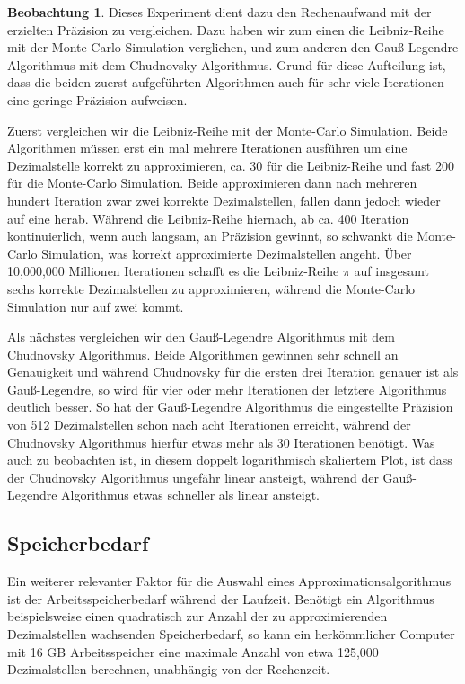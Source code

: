 \documentclass{scrartcl}
\theoremstyle{definition}
\newtheorem{approximation sequence}{Annäherungsfolge}
\newtheorem{observation}{Beobachtung}
\begin{document}
\begin{observation}
    Dieses Experiment dient dazu den Rechenaufwand mit der erzielten Präzision
    zu vergleichen. Dazu haben wir zum einen die Leibniz-Reihe mit der
    Monte-Carlo Simulation verglichen, und zum anderen den Gauß-Legendre
    Algorithmus mit dem Chudnovsky Algorithmus. Grund für diese Aufteilung ist,
    dass die beiden zuerst aufgeführten Algorithmen auch für sehr viele
    Iterationen eine geringe Präzision aufweisen.

    Zuerst vergleichen wir die Leibniz-Reihe mit der Monte-Carlo Simulation.
    Beide Algorithmen müssen erst ein mal mehrere Iterationen ausführen um eine
    Dezimalstelle korrekt zu approximieren, ca. 30 für die Leibniz-Reihe und
    fast 200 für die Monte-Carlo Simulation. Beide approximieren dann nach
    mehreren hundert Iteration zwar zwei korrekte Dezimalstellen, fallen dann
    jedoch wieder auf eine herab. Während die Leibniz-Reihe hiernach, ab ca.
    400 Iteration kontinuierlich, wenn auch langsam, an Präzision gewinnt, so
    schwankt die Monte-Carlo Simulation, was korrekt approximierte
    Dezimalstellen angeht. Über 10,000,000 Millionen Iterationen schafft es die
    Leibniz-Reihe \(\pi\) auf insgesamt sechs korrekte Dezimalstellen zu
    approximieren, während die Monte-Carlo Simulation nur auf zwei kommt.

    Als nächstes vergleichen wir den Gauß-Legendre Algorithmus mit dem
    Chudnovsky Algorithmus. Beide Algorithmen gewinnen sehr schnell an
    Genauigkeit und während Chudnovsky für die ersten drei Iteration genauer
    ist als Gauß-Legendre, so wird für vier oder mehr Iterationen der letztere
    Algorithmus deutlich besser. So hat der Gauß-Legendre Algorithmus die
    eingestellte Präzision von 512 Dezimalstellen schon nach acht Iterationen
    erreicht, während der Chudnovsky Algorithmus hierfür etwas mehr als 30
    Iterationen benötigt. Was auch zu beobachten ist, in diesem doppelt
    logarithmisch skaliertem Plot, ist dass der Chudnovsky Algorithmus ungefähr
    linear ansteigt, während der Gauß-Legendre Algorithmus etwas schneller als
    linear ansteigt.
\end{observation}

\pagebreak

\subsection{Speicherbedarf}

Ein weiterer relevanter Faktor für die Auswahl eines Approximationsalgorithmus
ist der Arbeitsspeicherbedarf während der Laufzeit. Benötigt ein Algorithmus
beispielsweise einen quadratisch zur Anzahl der zu approximierenden
Dezimalstellen wachsenden Speicherbedarf, so kann ein herkömmlicher Computer
mit 16 GB Arbeitsspeicher eine maximale Anzahl von etwa 125,000 Dezimalstellen
berechnen, unabhängig von der Rechenzeit.
\end{document}
